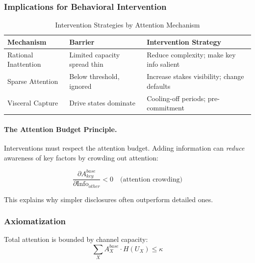 \subsubsection{Implications for Behavioral Intervention}
\label{subsubsec:intervention-implications}

\begin{table}[htbp]
\centering
\caption{Intervention Strategies by Attention Mechanism}
\label{tab:intervention-attention}
\renewcommand{\arraystretch}{1.4}
\begin{tabular}{@{}lp{5cm}p{5cm}@{}}
\toprule
\textbf{Mechanism} & \textbf{Barrier} & \textbf{Intervention Strategy} \\
\midrule
Rational Inattention & 
Limited capacity spread thin &
Reduce complexity; make key info salient \\
Sparse Attention & 
Below threshold, ignored &
Increase stakes visibility; change defaults \\
Visceral Capture & 
Drive states dominate &
Cooling-off periods; pre-commitment \\
\bottomrule
\end{tabular}
\end{table}

\paragraph{The Attention Budget Principle.}
Interventions must respect the attention budget. Adding information can 
\emph{reduce} awareness of key factors by crowding out attention:

\begin{equation}
\frac{\partial A^{base}_{key}}{\partial \text{Info}_{other}} < 0 \quad \text{(attention crowding)}
\end{equation}

This explains why simpler disclosures often outperform detailed ones.

\subsubsection{Axiomatization}
\label{subsubsec:axiomatization}

\begin{tcolorbox}[colback=gray!5!white, colframe=gray!75!black, title=Axiom AWX-A07: Attention Scarcity]
Total attention is bounded by channel capacity:
\begin{equation}
\sum_X A^{base}_X \cdot H(U_X) \leq \kappa
\end{equation}
\end{tcolorbox}

